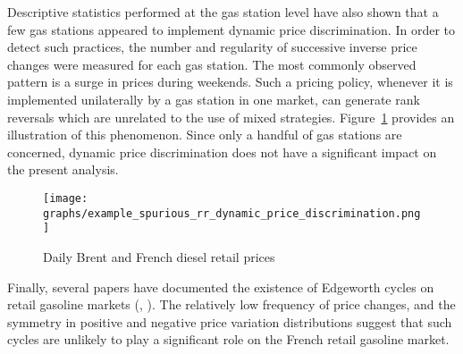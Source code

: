 \documentclass[english]{article}
\begin{document}
Descriptive statistics performed at the gas station level have also shown that a few gas stations appeared to implement dynamic price discrimination. In order to detect such practices, the number and regularity of successive inverse price changes were measured for each gas station. The most commonly observed pattern is a surge in prices during weekends. Such a pricing policy, whenever it is implemented unilaterally by a gas station in one market, can generate rank reversals which are unrelated to the use of mixed strategies. Figure~\ref{fig:rr_dynamic_price_discrimination} provides an illustration of this phenomenon. Since only a handful of gas stations are concerned, dynamic price discrimination does not have a significant impact on the present analysis.

\begin{figure}[H]
    \caption{Daily Brent and French diesel retail prices}
	\centering
		\texttt{[image: graphs/example\_spurious\_rr\_dynamic\_price\_discrimination.png]}
\label{fig:rr_dynamic_price_discrimination}
\end{figure}

Finally, several papers have documented the existence of Edgeworth cycles on retail gasoline markets (\cite{ECK03}, \cite{NOE07}). The relatively low frequency of price changes, and the symmetry in positive and negative price variation distributions suggest that such cycles are unlikely to play a significant role on the French retail gasoline market.
\end{document}
